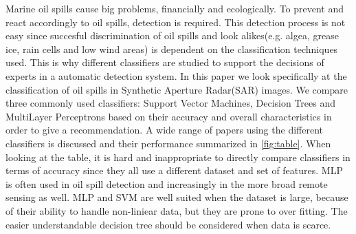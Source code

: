 Marine oil spills cause big problems, financially and ecologically. To prevent and react accordingly to oil spills, detection is required. This detection process is not easy since succesful discrimination of oil spills and look alikes(e.g. algea, grease ice, rain cells and low wind areas) is dependent on the classification techniques used. This is why different classifiers are studied to support the decisions of experts in a automatic detection system. In this paper we look specifically at the classification of oil spills in Synthetic Aperture Radar(SAR) images. We compare three commonly used classifiers: Support Vector Machines, Decision Trees and MultiLayer Perceptrons based on their accuracy and overall characteristics in order to give a recommendation. A wide range of papers using the different classifiers is discussed and their performance summarized in \ref{fig:table}. When looking at the table, it is hard and inappropriate to directly compare classifiers in terms of accuracy since they all use a different dataset and set of features. MLP is often used in oil spill detection and increasingly in the more broad remote sensing as well. MLP and SVM are well suited when the dataset is large, because of their ability to handle non-liniear data, but they are prone to over fitting. The easier understandable decision tree should be considered when data is scarce.

